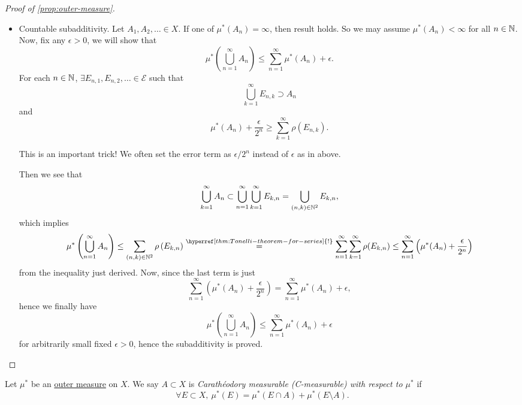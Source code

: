 \begin{proof}[Proof of \autoref{prop:outer-measure}]
\begin{itemize}
		\item Countable subadditivity. Let \(A_1, A_2, \ldots \in X \). If one of \(\mu^{*} (A_{n}) = \infty \), then result holds.
		      So we may assume \(\mu^{*} (A_n)<\infty \) for all \(n\in \mathbb{\MakeUppercase{N}} \). Now, fix any \(\epsilon >0\),
		      we will show that
		      \[
			      \mu^{*} \left(\bigcup\limits_{n=1}^{\infty} A_n\right)\leq \sum\limits_{n=1}^{\infty} \mu^{*} (A_n)+\epsilon.
		      \]
		      For each \(n\in\mathbb{\MakeUppercase{N}} \), \(\exists E_{n, 1}, E_{n, 2}, \ldots \in \mathcal{E}\) such that
		      \[
			      \bigcup\limits_{k=1}^{\infty} E_{n, k}\supset A_n
		      \]
		      and
		      \[
			      \mu^{*} (A_n)+\frac{\epsilon}{2^n} \geq \sum\limits_{k=1}^{\infty} \rho(E_{n, k}).
		      \]
		      \begin{remark}
			      This is an important trick! We often set the error term as \(\epsilon / 2^n\) instead of \(\epsilon \) as in above.
		      \end{remark}

		      Then we see that
		      \[
			      \bigcup\limits_{k=1}^{\infty} A_n \subset \bigcup\limits_{n=1}^{\infty} \bigcup\limits_{k=1}^{\infty} E_{k, n} = \bigcup\limits_{(n, k)\in\mathbb{\MakeUppercase{N}} ^2} E_{k, n},
		      \]
		      which implies
		      \[
			      \mu^{*} \left(\bigcup\limits_{n=1}^{\infty} A_{n}\right)
			      \leq \sum\limits_{(n, k)\in\mathbb{\MakeUppercase{N}} ^2} \rho\left(E_{k, n}\right)
			      \overset{\hyperref[thm:Tonelli-theorem-for-series]{\text{!}}}{=} \sum\limits_{n=1}^{\infty} \sum\limits_{k=1}^{\infty} \rho(E_{k, n})
			      \leq \sum\limits_{n=1}^{\infty} \left(\mu^{*} (A_n) + \frac{\epsilon}{2^n}\right)
		      \]
		      from the inequality just derived. Now, since the last term is just
		      \[
			      \sum\limits_{n=1}^{\infty} \left(\mu^{*} (A_n) + \frac{\epsilon}{2^n}\right) = \sum\limits_{n=1}^{\infty} \mu^{*} (A_n)+\epsilon,
		      \]
		      hence we finally have
		      \[
			      \mu^{*} \left(\bigcup\limits_{n=1}^{\infty} A_{n}\right)\leq \sum\limits_{n=1}^{\infty} \mu^{*} (A_n)+\epsilon
		      \]
		      for arbitrarily small fixed \(\epsilon >0\), hence the subadditivity is proved.
	\end{itemize}
\end{proof}

\begin{definition}\label{def:C-measurable}
	Let \(\mu^{*} \) be an \hyperref[def:outer-measure]{outer measure} on \(X\). We say \(A\subset X\) is \emph{Carathéodory measurable (C-measurable) with respect to \(\mu^{*} \)} if
	\[
		\forall E\subset X,\ \mu^{*} (E) = \mu^{*} \left(E\cap A\right) + \mu^{*} \left(E\setminus A\right).
	\]
\end{definition}

